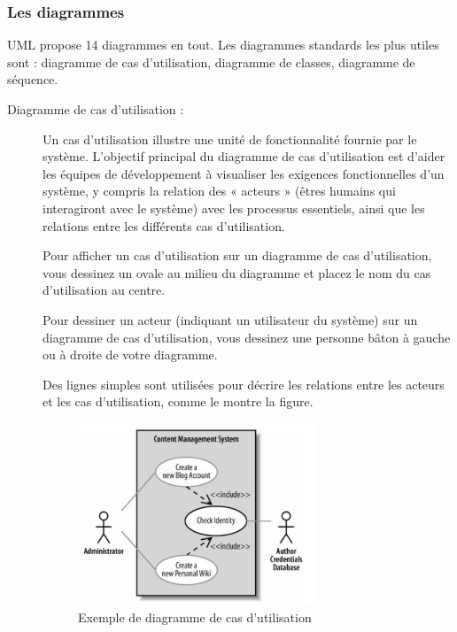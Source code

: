 \documentclass[french]{report}
\begin{document}
        \subsubsection{Les diagrammes}
        UML propose 14 diagrammes en tout. Les diagrammes standards les plus utiles sont :
	diagramme de cas d'utilisation, diagramme de classes, diagramme de séquence.
            \begin{description}
                \item[Diagramme de cas d'utilisation :]
                Un cas d'utilisation illustre une unité de fonctionnalité fournie par le système.
		L'objectif principal du diagramme de cas d'utilisation est d'aider les équipes de développement
		à visualiser les exigences fonctionnelles d'un système, y compris la relation des « acteurs »
		(êtres humains qui interagiront avec le système) avec les processus essentiels,
		ainsi que les relations entre les différents cas d'utilisation.\cite{IBM}
                
                Pour afficher un cas d'utilisation sur un diagramme de cas d'utilisation, 
		vous dessinez un ovale au milieu du diagramme et placez le nom du cas d'utilisation au centre.\cite{IBM}
                
                Pour dessiner un acteur (indiquant un utilisateur du système) sur un diagramme de cas d'utilisation,
		vous dessinez une personne bâton à gauche ou à droite de votre diagramme.\cite{IBM}
                
                Des lignes simples sont utilisées pour décrire les relations entre les acteurs et les cas d'utilisation,
		comme le montre la figure.\cite{IBM}
                
                \begin{figure}[!h] 
                    \center 
                    \includegraphics[width=0.7\textwidth,keepaspectratio]{images/use case exemple.png} 
                    \caption{Exemple de diagramme de cas d'utilisation}
                    \label{UML logo}
                \end{figure}
                

\end{description}
\end{document}
